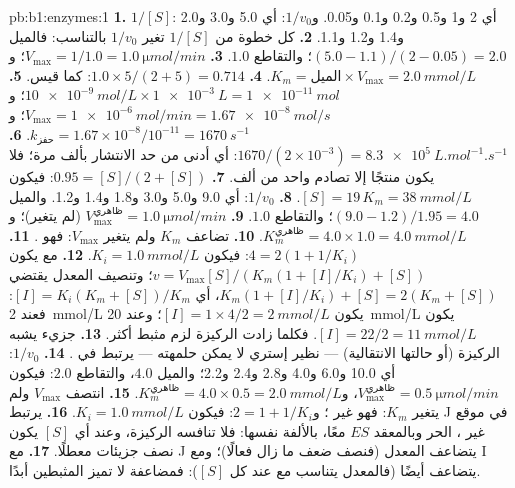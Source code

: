 \begin{solution}{pb:b1:enzymes:1}
\textbf{1.} $1/[S]$: أي 2 و1 و0.5 و0.2 و0.1 و0.05. و$1/v_0$: أي
5.0 و3.0 و2.0 و1.4 و1.2 و1.1.
\textbf{2.} كل خطوة من $1/[S]$ تغير $1/v_0$ بالتناسب: فالميل
$(5.0 - 1.1)/(2 - 0.05) = 2.0$؛ والتقاطع $1.0$.
\textbf{3.} $V_{\max} = 1/1.0 = \qty{1.0}{\micro mol/min}$؛
و$K_m =
\text{الميل}\times V_{\max} = \qty{2.0}{mmol/L}$.
\textbf{4.} $1.0\times 5/(2 + 5) = 0.714$: كما قيس.
\textbf{5.} $\qty{10e-9}{mol/L}\times\qty{1e-3}{L} = \qty{1e-11}{mol}$؛
و$V_{\max} = \qty{1e-6}{mol/min} = \qty{1.67e-8}{mol/s}$؛
و$k_{\text{حفز}} = 1.67\times 10^{-8}/10^{-11} = \qty{1670}{s^{-1}}$.
\textbf{6.} $1670/(2\times 10^{-3}) = \qty{8.3e5}{L.mol^{-1}.s^{-1}}$:
أي أدنى من حد الانتشار بألف مرة؛ فلا يكون منتجًا إلا تصادم واحد من
ألف.
\textbf{7.} $0.95 = [S]/(2 + [S])$: فيكون
$[S] = 19\,K_m = \qty{38}{mmol/L}$.
\textbf{8.} $1/v_0$: أي 9.0 و5.0 و3.0 و1.8 و1.4 و1.2. والميل
$(9.0 -
1.2)/1.95 = 4.0$؛ والتقاطع $1.0$.
\textbf{9.} $V_{\max}^{\text{ظاهري}} = \qty{1.0}{\micro mol/min}$
(لم يتغير)؛ و$K_m^{\text{ظاهري}} = 4.0\times 1.0 = \qty{4.0}{mmol/L}$.
\textbf{10.} تضاعف $K_m$ ولم يتغير $V_{\max}$: فهو .
\textbf{11.} $4 = 2(1 + 1/K_i)$: فيكون $K_i = \qty{1.0}{mmol/L}$.
\textbf{12.} مع  يكون $v = V_{\max}[S]/(K_m(1 + [I]/K_i) +
[S])$؛ وتنصيف المعدل يقتضي $K_m(1 + [I]/K_i) + [S] = 2(K_m +
[S])$، أي $[I] = K_i(K_m + [S])/K_m$: فعند \qty{2}{mmol/L} يكون
$[I] =
1\times 4/2 = \qty{2}{mmol/L}$؛ وعند \qty{20}{mmol/L} يكون
$[I] = 22/2 =
\qty{11}{mmol/L}$. فكلما زادت الركيزة لزم مثبط أكثر.
\textbf{13.} جزيء يشبه الركيزة (أو حالتها الانتقالية) --- نظير إستري
لا يمكن حلمهته --- يرتبط في .
\textbf{14.} $1/v_0$: أي 10.0 و6.0 و4.0 و2.8 و2.4 و2.2؛ والميل
$4.0$، والتقاطع $2.0$: فيكون
$V_{\max}^{\text{ظاهري}} = \qty{0.5}{\micro mol/min}$،
و$K_m^{\text{ظاهري}} = 4.0\times 0.5 = \qty{2.0}{mmol/L}$.
\textbf{15.} انتصف $V_{\max}$ ولم يتغير $K_m$: فهو غير ؛
و$2 = 1 + 1/K_i$: فيكون $K_i = \qty{1.0}{mmol/L}$.
\textbf{16.} يرتبط J في موقع غير ،  الحر
وبالمعقد $ES$ معًا، بالألفة نفسها: فلا تنافسه الركيزة، وعند أي $[S]$
يكون نصف جزيئات  معطلًا.
\textbf{17.} مع J يتضاعف المعدل (فنصف ضعف  ما زال فعالًا)؛
ومع I يتضاعف أيضًا (فالمعدل يتناسب مع  عند كل $[S]$):
فمضاعفة  لا تميز المثبطين أبدًا.

\end{solution}
